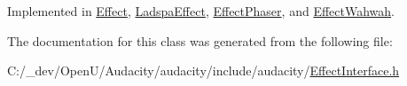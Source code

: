 Implemented in \hyperlink{class_effect_ab23b370c5581370daa2bcda0979dea07}{Effect}, \hyperlink{class_ladspa_effect_a1b74e7681ed9aa961dd358f71ec940ee}{Ladspa\+Effect}, \hyperlink{class_effect_phaser_ac9d4244fee9f1239d9f5bf548c4baad3}{Effect\+Phaser}, and \hyperlink{class_effect_wahwah_a011e75206ccb3b06c0d622cce2962bea}{Effect\+Wahwah}.



The documentation for this class was generated from the following file\+:\begin{DoxyCompactItemize}
\item 
C\+:/\+\_\+dev/\+Open\+U/\+Audacity/audacity/include/audacity/\hyperlink{_effect_interface_8h}{Effect\+Interface.\+h}\end{DoxyCompactItemize}
